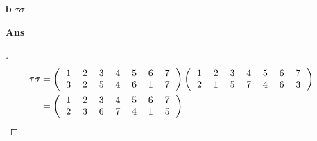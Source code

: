 \documentclass[paper=usletter, fontsize=12pt]{article}
\begin{document}
\begin{itemize}
\begin{itemize}
\begin{itemize}
                \item[\textbf{b}] $\tau\sigma$
                \item[\textbf{Ans}]
                \begin{proof}[\unskip\nopunct]
                    \begingroup
                    \addtolength{\jot}{1em}
                    \begin{align*}
                        \tau\sigma &= \left(
                            \begin{tabular}{ccccccc}
                                1 & 2 & 3 & 4 & 5 & 6 & 7 \\
                                3 & 2 & 5 & 4 & 6 & 1 & 7
                            \end{tabular}
                        \right)\left(
                            \begin{tabular}{ccccccc}
                                1 & 2 & 3 & 4 & 5 & 6 & 7 \\
                                2 & 1 & 5 & 7 & 4 & 6 & 3
                            \end{tabular}
                        \right) \\
                        &= \left(
                            \begin{tabular}{ccccccc}
                                1 & 2 & 3 & 4 & 5 & 6 & 7 \\
                                2 & 3 & 6 & 7 & 4 & 1 & 5
                            \end{tabular}
                        \right)
                    \end{align*} \qedhere
                    \endgroup
                \end{proof}
                \vspace{0.2in}


\end{itemize}
\end{itemize}
\end{itemize}
\end{document}
